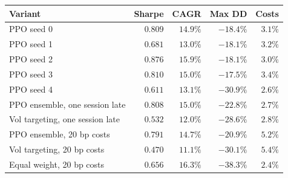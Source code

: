 \begin{tabular}{lrrrr}
\toprule
Variant & Sharpe & CAGR & Max DD & Costs \\
\midrule
PPO seed 0 & $0.809$ & $14.9\%$ & $-18.4\%$ & $3.1\%$ \\
PPO seed 1 & $0.681$ & $13.0\%$ & $-18.1\%$ & $3.2\%$ \\
PPO seed 2 & $0.876$ & $15.9\%$ & $-18.1\%$ & $3.0\%$ \\
PPO seed 3 & $0.810$ & $15.0\%$ & $-17.5\%$ & $3.4\%$ \\
PPO seed 4 & $0.611$ & $13.1\%$ & $-30.9\%$ & $2.6\%$ \\
\midrule
PPO ensemble, one session late & $0.808$ & $15.0\%$ & $-22.8\%$ & $2.7\%$ \\
Vol targeting, one session late & $0.532$ & $12.0\%$ & $-28.6\%$ & $2.8\%$ \\
\midrule
PPO ensemble, 20 bp costs & $0.791$ & $14.7\%$ & $-20.9\%$ & $5.2\%$ \\
Vol targeting, 20 bp costs & $0.470$ & $11.1\%$ & $-30.1\%$ & $5.4\%$ \\
Equal weight, 20 bp costs & $0.656$ & $16.3\%$ & $-38.3\%$ & $2.4\%$ \\
\bottomrule
\end{tabular}
